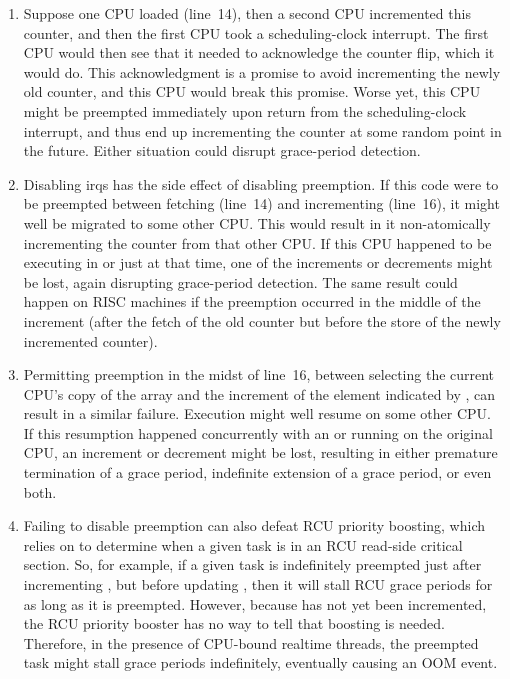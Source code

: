 \begin{enumerate}
\item	Suppose one CPU loaded 
	(line~14), then a second CPU incremented this counter,
	and then the first CPU took a scheduling-clock interrupt.
	The first CPU would then see that it needed to acknowledge
	the counter flip, which it would do.
	This acknowledgment is a promise to avoid incrementing
	the newly old counter, and this CPU would break this
	promise.
	Worse yet, this CPU might be preempted immediately upon
	return from the scheduling-clock interrupt, and thus
	end up incrementing the counter at some random point
	in the future.
	Either situation could disrupt grace-period detection.
\item	Disabling irqs has the side effect of disabling preemption.
	If this code were to be preempted between fetching
	 (line~14) and
	incrementing  (line~16),
	it might well be migrated to some other CPU.
	This would result in it non-atomically incrementing
	the counter from that other CPU.
	If this CPU happened to be executing in 
	or  just at that time, one
	of the increments or decrements might be lost, again
	disrupting grace-period detection.
	The same result could happen on RISC machines if the preemption
	occurred in the middle of the increment (after the fetch of
	the old counter but before the store of the newly incremented
	counter).
\item	Permitting preemption in the midst
	of line~16, between selecting the current CPU's copy
	of the  array and the increment of
	the element indicated by , can
	result in a similar failure.
	Execution might well resume on some other CPU.
	If this resumption happened concurrently with an
	 or 
	running on the original CPU,
	an increment or decrement might be lost, resulting in either
	premature termination of a grace period, indefinite extension
	of a grace period, or even both.
\item	Failing to disable preemption can also defeat RCU priority
	boosting, which relies on 
	to determine when a given task is in an RCU read-side
	critical section.
	So, for example, if a given task is indefinitely
	preempted just after incrementing ,
	but before updating ,
	then it will stall RCU grace periods for as long as it
	is preempted.
	However, because  has not
	yet been incremented, the RCU priority booster has no way
	to tell that boosting is needed.
	Therefore, in the presence of CPU-bound realtime threads,
	the preempted task might stall grace periods indefinitely,
	eventually causing an OOM event.
\end{enumerate}


